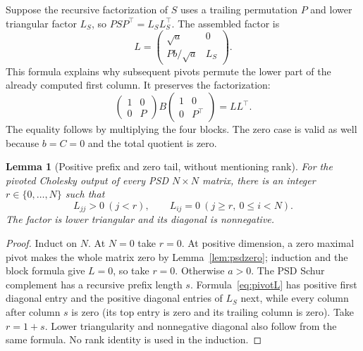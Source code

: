 \documentclass[11pt]{article}
\newtheorem{lemma}[theorem]{Lemma}
\theoremstyle{remark}\newtheorem{remark}[theorem]{Remark}
\numberwithin{equation}{section}
\begin{document}
Suppose the recursive factorization of $S$ uses a trailing permutation
$P$ and lower triangular factor $L_S$, so $PSP^\top=L_SL_S^\top$.
The assembled factor is
\begin{equation}\label{eq:pivotL}
 L=\begin{pmatrix}\sqrt a&0\\Pb/\sqrt a&L_S\end{pmatrix}.
\end{equation}
This formula explains why subsequent pivots permute the lower part of
the already computed first column. It preserves the factorization:
\[
 \begin{pmatrix}1&0\\0&P\end{pmatrix}B
 \begin{pmatrix}1&0\\0&P^\top\end{pmatrix}=LL^\top.
\]
The equality follows by multiplying the four blocks. The zero case is
valid as well because $b=C=0$ and the total quotient is zero.

\begin{lemma}[Positive prefix and zero tail, without mentioning rank]
\label{lem:prefix}
For the pivoted Cholesky output of every PSD $N\times N$ matrix, there
is an integer $r\in\{0,\ldots,N\}$ such that
\[
 L_{jj}>0\ (j<r),\qquad L_{ij}=0\ (j\ge r,\ 0\le i<N).
\]
The factor is lower triangular and its diagonal is nonnegative.
\end{lemma}
\begin{proof}
Induct on $N$. At $N=0$ take $r=0$. At positive dimension, a zero maximal
pivot makes the whole matrix zero by Lemma~\ref{lem:psdzero}; induction
and the block formula give $L=0$, so take $r=0$.
Otherwise $a>0$. The PSD Schur complement has a recursive prefix length
$s$. Formula~\eqref{eq:pivotL} has positive first diagonal entry and
the positive diagonal entries of $L_S$ next, while every column after
column $s$ is zero (its top entry is zero and its trailing column is
zero). Take $r=1+s$. Lower triangularity and nonnegative diagonal also
follow from the same formula. No rank identity is used in the induction.
\end{proof}
\end{document}
